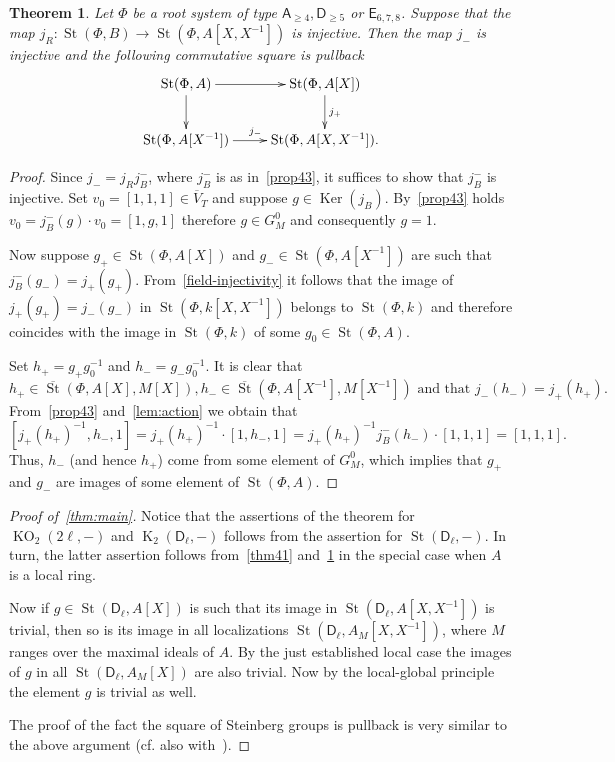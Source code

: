\documentclass[oneside, 8pt]{amsart}
\newtheorem{externaltheorem}[lemma]{Theorem}
\theoremstyle{remark}
\theoremstyle{definition}
\numberwithin{lemma}{section}
\numberwithin{prop}{section}
\numberwithin{corollary}{section}
\numberwithin{externaltheorem}{section}
\DeclareMathOperator{\Ker}{Ker}
\DeclareMathOperator{\St}{St}
\DeclareMathOperator{\K}{K}
\DeclareMathOperator{\KO}{KO}
\newcommand{\inv}{^{-1}}
\newcommand{\rA}{\mathsf{A}}
\newcommand{\rD}{\mathsf{D}}
\newcommand{\rE}{\mathsf{E}}
\numberwithin{equation}{section}
\begin{document}
\begin{externaltheorem} \label{thm:P1glueing}
 Let $\Phi$ be a root system of type $\rA_{\geq 4}, \rD_{\geq 5}$ or $\rE_{6,7,8}$.
 Suppose that the map $j_R \colon \St(\Phi, B) \to \St(\Phi, A[X, X\inv])$ is injective.  
 Then the map $j_-$ is injective and the following commutative square is pullback
 \begin{equation} \nonumber
  \xymatrix{ \St(\Phi, A) \ar[r] \ar[d] & \St(\Phi, A[X]) \ar[d]^{j_+} \\ \St(\Phi, A[X\inv]) \ar[r]^{j_-} & \St(\Phi, A[X, X\inv]).}
 \end{equation}
\end{externaltheorem}
\begin{proof} Since $j_- = j_R j_B^-$, where $j_B^-$ is as in~\cref{prop43}, it suffices to show that $j_B^-$ is injective.
 Set $v_0 = [1, 1, 1] \in \overline{V}_T$ and suppose $g \in \Ker(j_B)$.
 By~\cref{prop43} holds $v_0 = j_B^-(g) \cdot v_0 = [1, g, 1]$ therefore $g \in G_M^0$ and consequently $g = 1$.
 
 Now suppose $g_+ \in \St(\Phi, A[X])$ and $g_- \in \St(\Phi, A[X\inv])$ are such that $j_B^-(g_-) = j_+(g_+)$.
 From~\cref{field-injectivity} it follows that the image of $j_+(g_+) = j_-(g_-)$ in $\St(\Phi, k[X, X\inv])$ belongs to $\St(\Phi, k)$ and therefore coincides with the image in $\St(\Phi, k)$ of some $g_0 \in \St(\Phi, A)$.
 
 Set $h_+ = g_+g_0^{-1}$ and $h_- = g_-g_0^{-1}$.
 It is clear that \[ h_+ \in \overline{\St}(\Phi, A[X], M[X]), h_- \in \overline{\St}(\Phi, A[X\inv], M[X\inv])\text{ and that }j_-(h_-) = j_+(h_+).\]
 From~\cref{prop43} and~\cref{lem:action} we obtain that
 \[ [j_+(h_+)^{-1}, h_-, 1] = j_+(h_+)^{-1} \cdot [1, h_-, 1] = j_+(h_+)^{-1} j_B^-(h_-) \cdot [1, 1, 1] = [1, 1, 1]. \]
 Thus, $h_-$ (and hence $h_+$) come from some element of $G_M^0$, which implies that $g_+$ and $g_-$ are images of some element of $\St(\Phi, A)$.
 \end{proof}
  
\begin{proof}[Proof of~\cref{thm:main}]
 Notice that the assertions of the theorem for $\KO_2(2\ell, -)$ and $\K_2(\rD_\ell, -)$ follows from the assertion for $\St(\rD_\ell, -)$.
 In turn, the latter assertion follows from~\cref{thm41} and~\cref{thm:P1glueing} in the special case when $A$ is a local ring.
 
 Now if $g \in \St(\rD_\ell, A[X])$ is such that its image in $\St(\rD_\ell, A[X, X\inv])$ is trivial, then so is its image in all localizations $\St(\rD_\ell, A_M[X, X\inv])$, where $M$ ranges over the maximal ideals of $A$. By the just established local case the images of $g$ in all $\St(\rD_\ell, A_M[X])$ are also trivial. Now by the local-global principle \cite[Theorem~2]{LS17} the element $g$ is trivial as well.  
 
 The proof of the fact the square of Steinberg groups is pullback is very similar   to the above argument (cf. also with~\cite[Theorem~5.1a]{Tu83}).
\end{proof}

\printbibliography
\end{document}
